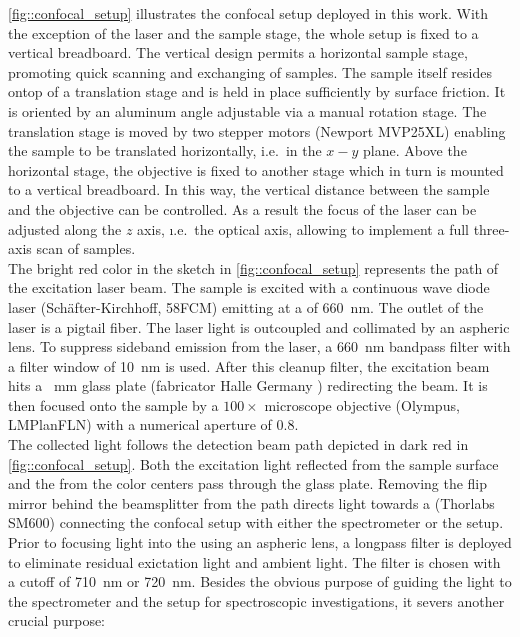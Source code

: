 		\autoref{fig::confocal_setup} illustrates the confocal setup deployed in this work.
		With the exception of the laser and the sample stage, the whole setup is fixed to a vertical breadboard.
		The vertical design permits a horizontal sample stage, promoting quick scanning and exchanging of samples.
		The sample itself resides ontop of a translation stage and is held in place sufficiently by surface friction.
		It is oriented by an aluminum angle adjustable via a manual rotation stage.
		The translation stage is moved by two stepper motors (Newport MVP25XL) enabling the sample to be translated horizontally, i.e.\ in the $x-y$ plane.
		Above the horizontal stage, the objective is fixed to another stage which in turn is mounted to a vertical breadboard.
		In this way, the vertical distance between the sample and the objective can be controlled. As a result the focus of the laser can be adjusted along the $z$ axis, \i.e.\ the optical axis, allowing to implement a full three-axis scan of samples.
		\\
		The bright red color in the sketch in \autoref{fig::confocal_setup} represents the path of the excitation laser beam.
		The sample is excited with a continuous wave diode laser (Sch\"after-Kirchhoff, 58FCM) emitting at a \wl of \SI{660}{\nano\meter}.
		The outlet of the laser is a pigtail fiber.
		The laser light is outcoupled and collimated by an aspheric lens.
		To suppress sideband emission from the laser, a \SI{660}{\nm} bandpass filter with a filter window of \SI{10}{\nm} is used.
		After this cleanup filter, the excitation beam hits a \SI{}{\milli\meter} glass plate (fabricator Halle Germany ) redirecting the beam. It is then focused onto the sample by a $100 \times$ microscope objective (Olympus, LMPlanFLN) with a numerical aperture of $0.8$.
		\\
		The collected light follows the detection beam path depicted in dark red in \autoref{fig::confocal_setup}.
		Both the excitation light reflected from the sample surface and the \fl from the color centers pass through the glass plate.
		Removing the flip mirror behind the beamsplitter from the path directs light towards a \smf (Thorlabs SM600) connecting the confocal setup with either the spectrometer or the \hbt setup. Prior to focusing light into the \smf using an aspheric lens, a longpass filter is deployed to eliminate residual exictation light and ambient light.
		The filter is chosen with a cutoff \wl of \SI{710}{\nm} or \SI{720}{\nm}.
		Besides the obvious purpose of guiding the \pl light to the spectrometer and the \HBT setup for spectroscopic investigations, it severs another crucial purpose:
